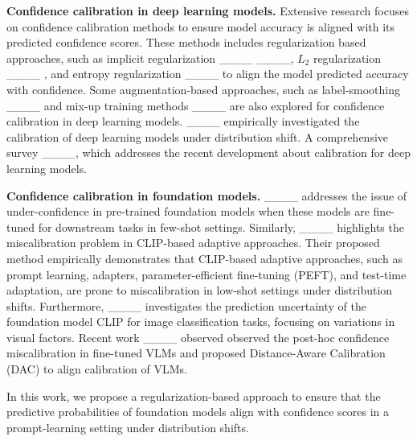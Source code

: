 \noindent\textbf{Confidence calibration in deep learning models.}
Extensive research focuses on confidence calibration methods to ensure model accuracy is aligned with its predicted confidence scores. These methods includes regularization based approaches, such as implicit regularization ____ ____, \(L_{2}\) regularization ____ , and entropy regularization ____ to align the model predicted accuracy with confidence. Some augmentation-based approaches, such as label-smoothing ____ and mix-up training methods ____ are also explored for confidence calibration in deep learning models. 
____ empirically investigated the calibration of deep learning models under distribution shift. A comprehensive survey ____, which addresses the recent development about calibration for deep learning models. 


\noindent\textbf{Confidence calibration in foundation models.}
____ addresses the issue of under-confidence in pre-trained foundation models when these models are fine-tuned for downstream tasks in few-shot settings. Similarly, ____ highlights the miscalibration problem in CLIP-based adaptive approaches. Their proposed method empirically demonstrates that CLIP-based adaptive approaches, such as prompt learning, adapters, parameter-efficient fine-tuning (PEFT), and test-time adaptation, are prone to miscalibration in low-shot settings under distribution shifts. Furthermore, ____ investigates the prediction uncertainty of the foundation model CLIP for image classification tasks, focusing on variations in visual factors. Recent work ____ observed observed the post-hoc confidence miscalibration in fine-tuned VLMs and proposed Distance-Aware Calibration (DAC) to align calibration of VLMs.  


In this work, we propose a regularization-based approach to ensure that the predictive probabilities of foundation models align with confidence scores in a prompt-learning setting under distribution shifts.